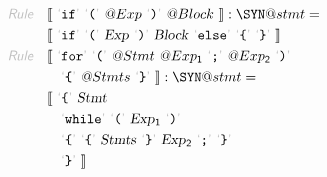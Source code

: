 \begin{align*}
  \KEY{Rule} \quad
    & \LEFTPHRASE \
        \LEX{if} \ \LEX{{(}} \ \VAR@Exp \ \LEX{{)}} \ \VAR@Block \
      \RIGHTPHRASE : \SYN@stmt = \\&
      \LEFTPHRASE \
        \LEX{if} \ \LEX{{(}} \ \VAR{Exp} \ \LEX{{)}} \ \VAR{Block} \ \LEX{else} \ \LEX{{\LEFTBRACE}} \ \LEX{{\RIGHTBRACE}} \
      \RIGHTPHRASE
\\
  \KEY{Rule} \quad
    & \LEFTPHRASE \
        \LEX{for} \ \LEX{{(}} \ \VAR@Stmt \ \VAR@Exp\SUB{1} \ \LEX{{;}} \ \VAR@Exp\SUB{2} \ \LEX{{)}} \\&\quad
        \LEX{{\LEFTBRACE}} \ \VAR@Stmts \ \LEX{{\RIGHTBRACE}} \
      \RIGHTPHRASE : \SYN@stmt = \\&
      \LEFTPHRASE \
        \LEX{{\LEFTBRACE}} \ \VAR{Stmt} \\&\quad
        \LEX{while} \ \LEX{{(}} \ \VAR{Exp}\SUB{1} \ \LEX{{)}} \\&\quad
        \LEX{{\LEFTBRACE}} \ \LEX{{\LEFTBRACE}} \ \VAR{Stmts} \ \LEX{{\RIGHTBRACE}} \ \VAR{Exp}\SUB{2} \ \LEX{{;}} \ \LEX{{\RIGHTBRACE}} \\&\quad
        \LEX{{\RIGHTBRACE}} \
      \RIGHTPHRASE
\end{align*}
